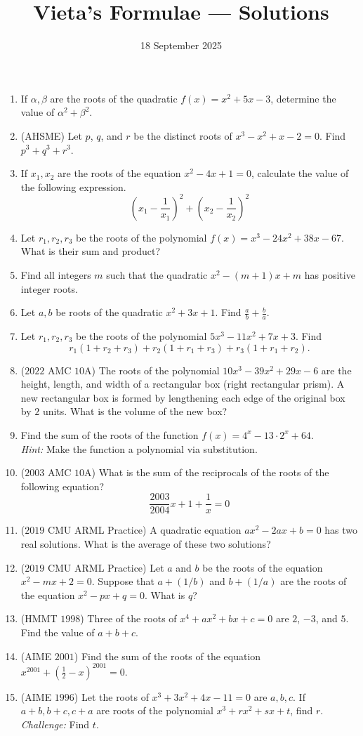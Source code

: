 \documentclass{tufte-handout}
\title{Vieta's Formulae — Solutions}
\author[IA Math Team]{}
\date{18 September 2025}
\begin{document}
\maketitle

\begin{enumerate}
    \item If $\alpha, \beta$ are the roots of the quadratic $f(x)=x^2+5x-3$, determine the value of $\alpha^2+\beta^2$.
    \item (AHSME) Let $p$, $q$, and $r$ be the distinct roots of $x^3 - x^2 + x - 2 = 0$. Find $p^3 + q^3 + r^3$.
    \item If $x_1, x_2$ are the roots of the equation $x^2-4x+1=0$, calculate the value of the following expression.
    \[\left(x_1-\dfrac1{x_1}\right)^2+\left(x_2-\dfrac1{x_2}\right)^2\]
    \item Let $r_1,r_2,r_3$ be the roots of the polynomial $f(x)=x^3-24x^2+38x-67$. What is their sum and product?
    \item Find all integers \(m\) such that the quadratic $x^2-(m+1)x+m$ has positive integer roots.
    \item Let $a,b$ be roots of the quadratic $x^2+3x+1$. Find $\frac ab + \frac ba$.
    \item Let $r_1,r_2,r_3$ be the roots of the polynomial $5x^3-11x^2+7x+3$. Find
    \[r_1(1+r_2+r_3)+r_2(1+r_1+r_3)+r_3(1+r_1+r_2).\]
    \item ($2022$ AMC $10$A) The roots of the polynomial $10x^3 - 39x^2 + 29x - 6$ are the height, length, and width of a rectangular box (right rectangular prism). A new rectangular box is formed by lengthening each edge of the original box by $2$ units. What is the volume of the new box?
    \item Find the sum of the roots of the function $f(x)=4^x-13\cdot 2^x+64$. \\
    \textit{Hint: } Make the function a polynomial via substitution.
    \item ($2003$ AMC $10$A) What is the sum of the reciprocals of the roots of the following equation? 
    \[\frac{2003}{2004}x+1+\frac{1}{x}=0\]
    \item ($2019$ CMU ARML Practice) A quadratic equation $ax^2 - 2ax + b = 0$ has two real solutions. What is the average of these two solutions?
    \item ($2019$ CMU ARML Practice) Let $a$ and $b$ be the roots of the equation $x^2 - mx + 2 = 0$. Suppose that $a + (1/b)$ and $b + (1/a)$ are the roots of the equation $x^2 - px + q = 0$. What is $q$?
    \item  (HMMT $1998$) Three of the roots of $x^4 + ax^2 + bx + c = 0$ are $2$, $-3$, and $5$. Find the value of $a + b + c$.
    \item (AIME $2001$) Find the sum of the roots of the equation $x^{2001}+(\frac12-x)^{2001}=0$.
    \item (AIME $1996$) Let the roots of $x^3+3x^2+4x-11=0$ are $a,b,c$. If $a+b,b+c,c+a$ are roots of the polynomial $x^3+rx^2+sx+t$, find $r$. \\\textit{Challenge: } Find $t$.
    
    
\end{enumerate}
\end{document}
